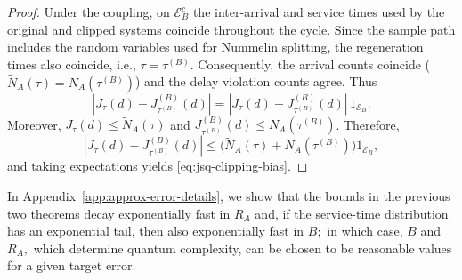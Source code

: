 \documentclass[11pt]{article}
\begin{document}
\begin{proof}
Under the coupling, on $\mathcal{E}_B^c$ the inter-arrival and service times used by
the original and clipped systems coincide throughout the cycle. Since the sample path includes the random variables used for Nummelin splitting, the regeneration times also coincide, i.e., $\tau = \tau^{(B)}$. Consequently, the arrival counts coincide ($\tilde{N}_A(\tau) = N_A(\tau^{(B)})$) and the delay violation counts agree. Thus
\[
|J_\tau(d)-J_{\tau^{(B)}}^{(B)}(d)|
=
|J_\tau(d)-J_{\tau^{(B)}}^{(B)}(d)|\,{1}_{\mathcal{E}_B}.
\]
Moreover, $J_\tau(d)\le \tilde{N}_A(\tau)$ and $J_{\tau^{(B)}}^{(B)}(d)\le N_A(\tau^{(B)})$.
Therefore,
\[
|J_\tau(d)-J_{\tau^{(B)}}^{(B)}(d)|
\le
\bigl(\tilde{N}_A(\tau)+N_A(\tau^{(B)})\bigr){1}_{\mathcal{E}_B},
\]
and taking expectations yields \eqref{eq:jsq-clipping-bias}.
\end{proof}

In Appendix~\ref{app:approx-error-details}, we show that the bounds in the previous two theorems decay exponentially fast in $R_A$ and, if the service-time distribution has an exponential tail, then also exponentially fast in $B;$ in which case, $B$ and $R_A,$ which determine quantum complexity, can be chosen to be reasonable values for a given target error.
\end{document}
